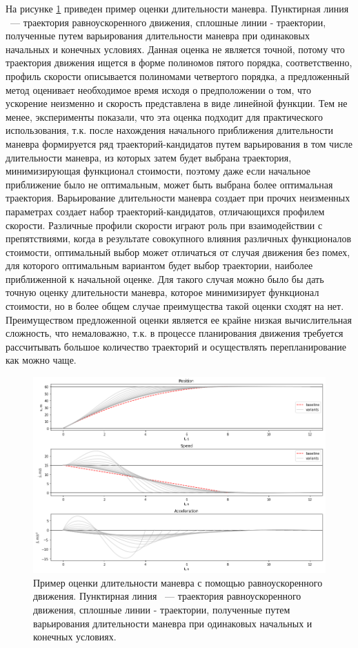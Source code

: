 На рисунке \ref{img:quintic_t_estimate} приведен пример оценки длительности маневра. Пунктирная линия ~---
траектория равноускоренного движения, сплошные линии - траектории, полученные путем варьирования длительности
маневра при одинаковых начальных и конечных условиях. Данная оценка не является точной, потому что траектория движения
ищется в форме полиномов пятого порядка, соответственно, профиль скорости описывается полиномами четвертого порядка,
а предложенный метод оценивает необходимое время исходя о предположении о том, что ускорение неизменно и скорость
представлена в виде линейной функции. Тем не менее, эксперименты показали, что эта оценка подходит для практического
использования, т.к. после нахождения начального приближения длительности маневра формируется ряд траекторий-кандидатов
путем варьирования в том числе длительности маневра, из которых затем будет выбрана траектория, минимизирующая
функционал стоимости, поэтому даже если начальное приближение было не оптимальным, может быть выбрана более оптимальная
траектория. Варьирование длительности маневра создает при прочих неизменных параметрах создает набор
траекторий-кандидатов, отличающихся профилем скорости. Различные профили скорости играют роль при взаимодействии
с препятствиями, когда в результате совокупного влияния различных функционалов стоимости, оптимальный выбор может
отличаться от случая движения без помех, для которого оптимальным вариантом будет выбор траектории, наиболее
приближенной к начальной оценке. Для такого случая можно было бы дать точную оценку длительности маневра, которое
минимизирует функционал стоимости, но в более общем случае преимущества такой оценки сходят на нет. Преимуществом
предложенной оценки является ее крайне низкая вычислительная сложность, что немаловажно, т.к. в процессе планирования
движения требуется рассчитывать большое количество траекторий и осуществлять перепланирование как можно чаще.

\begin{figure}[h]
      \centering
      \includegraphics[width=\linewidth]{images/quintic_t_estimate}
      \caption{Пример оценки длительности маневра с помощью равноускоренного движения. Пунктирная линия ~---
      траектория равноускоренного движения, сплошные линии - траектории, полученные путем варьирования длительности
      маневра при одинаковых начальных и конечных условиях.}
      \label{img:quintic_t_estimate}
\end{figure}

